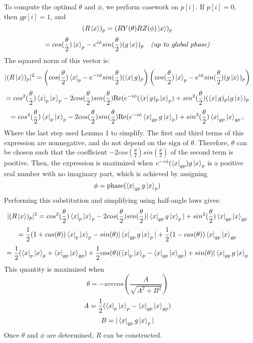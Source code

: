 \documentclass{article}
\begin{document}
To compute the optimal $\theta$ and $\phi$, we perform casework on $p[i]$. 
If $p[i] = 0$, then
$gp[i] = 1$, and
$$(R\mathinner{|{x}\rangle})_p = (RY(\theta)RZ(\phi)\mathinner{|{x}\rangle})_p$$
$$ = cos(\frac{\theta}{2})\mathinner{|{x}\rangle}_p - e^{i\phi}sin(\frac{\theta}{2})(g\mathinner{|{x}\rangle})_{p} \quad \textit{(up to global phase)}$$
The squared norm of this vector is:
$$ |(R\mathinner{|{x}\rangle})_p|^2 = \left(cos(\frac{\theta}{2})\mathinner{\langle{x}|}_p - e^{-i\phi}sin(\frac{\theta}{2})(\mathinner{\langle{x}|}g)_p\right)\left(cos(\frac{\theta}{2})\mathinner{|{x}\rangle}_p - e^{i\phi}sin(\frac{\theta}{2})(g\mathinner{|{x}\rangle})_p\right)$$
$$ = cos^2(\frac{\theta}{2})\mathinner{\langle{x}|}_p\mathinner{|{x}\rangle}_p - 2cos(\frac{\theta}{2})sin(\frac{\theta}{2})\text{Re}(e^{-i\phi}(\mathinner{\langle{x}|}g)_p\mathinner{|{x}\rangle}_p) + sin^2(\frac{\theta}{2})(\mathinner{\langle{x}|}g)_p(g\mathinner{|{x}\rangle})_p$$
$$ = cos^2(\frac{\theta}{2})\mathinner{\langle{x}|}_p\mathinner{|{x}\rangle}_p - 2cos(\frac{\theta}{2})sin(\frac{\theta}{2})\text{Re}(e^{-i\phi}\mathinner{\langle{x}|}_{gp}g\mathinner{|{x}\rangle}_p) + sin^2(\frac{\theta}{2})\mathinner{\langle{x}|}_{gp}\mathinner{|{x}\rangle}_{gp},$$
Where the last step used Lemma 1 to simplify. The first and third terms of 
this expression are nonnegative, and do not depend on the sign of $\theta$. 
Therefore, $\theta$ can be chosen such that the coefficient
$-2cos(\frac{\theta}{2})sin(\frac{\theta}{2})$ of the second term is positive.
Then, the expression is maximized when $e^{-i\phi}(\mathinner{\langle{x}|}_{gp})g\mathinner{|{x}\rangle}_p$
is a positive real number with no imaginary part, which is achieved by assigning
$$\phi = \text{phase}(\mathinner{\langle{x}|}_{gp}g\mathinner{|{x}\rangle}_p)$$
Performing this substitution and simplifying using half-angle laws gives:
$$|(R\mathinner{|{x}\rangle})_p|^2 = cos^2(\frac{\theta}{2})\mathinner{\langle{x}|}_p\mathinner{|{x}\rangle}_p - 2cos(\frac{\theta}{2})sin(\frac{\theta}{2})|\mathinner{\langle{x}|}_{gp}g\mathinner{|{x}\rangle}_p| + sin^2(\frac{\theta}{2})\mathinner{\langle{x}|}_{gp}\mathinner{|{x}\rangle}_{gp}$$
$$ = \frac{1}{2}(1 + cos(\theta))\mathinner{\langle{x}|}_p\mathinner{|{x}\rangle}_p - sin(\theta)|\mathinner{\langle{x}|}_{gp}g\mathinner{|{x}\rangle}_p| + \frac{1}{2}(1 - cos(\theta))\mathinner{\langle{x}|}_{gp}\mathinner{|{x}\rangle}_{gp}$$
$$ = \frac{1}{2}(\mathinner{\langle{x}|}_p\mathinner{|{x}\rangle}_p + \mathinner{\langle{x}|}_{gp}\mathinner{|{x}\rangle}_{gp})
   + \frac{1}{2}cos(\theta)(\mathinner{\langle{x}|}_p\mathinner{|{x}\rangle}_p - \mathinner{\langle{x}|}_{gp}\mathinner{|{x}\rangle}_{gp})
   + sin(\theta)|\mathinner{\langle{x}|}_{gp}g\mathinner{|{x}\rangle}_p$$
This quantity is maximized when 
$$\theta = -arccos(\frac{A}{\sqrt{A^2 + B^2}})$$
$$A = \frac{1}{2}(\mathinner{\langle{x}|}_p\mathinner{|{x}\rangle}_p - \mathinner{\langle{x}|}_{gp}\mathinner{|{x}\rangle}_{gp})$$
$$B = |\mathinner{\langle{x}|}_{gp}g\mathinner{|{x}\rangle}_p|$$
Once $\theta$ and $\phi$ are determined, $R$ can be constructed. 
\end{document}
